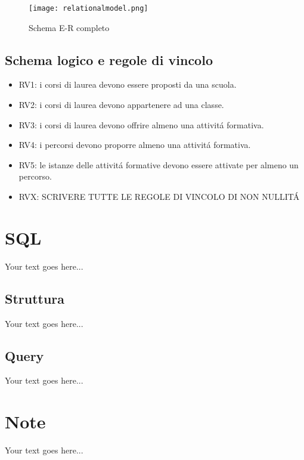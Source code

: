\documentclass[a4paper,12pt,italian,towside]{article}
\begin{document}
\begin{figure} [!h] %
	\caption{Schema E-R completo}
	\begin{center}
		\texttt{[image: relationalmodel.png]} %
	\end{center}
\end{figure}

\subsection{Schema logico e regole di vincolo}
\begin{itemize}
	\item RV1: i corsi di laurea devono essere proposti da una scuola.
	\item RV2: i corsi di laurea devono appartenere ad una classe.
	\item RV3: i corsi di laurea devono offrire almeno una attivit\'a formativa.
	\item RV4: i percorsi devono proporre almeno una attivit\'a formativa.
	\item RV5: le istanze delle attivit\'a formative devono essere attivate per almeno un percorso.
	\item RVX: \textcolor{red!50}{SCRIVERE TUTTE LE REGOLE DI VINCOLO DI NON NULLIT\'A}
\end{itemize}

\newpage
\section{SQL}

Your text goes here...

\subsection{Struttura}

Your text goes here...

\subsection{Query}

Your text goes here...
\newpage

\section{Note}

Your text goes here...


%
%

\end{document}
